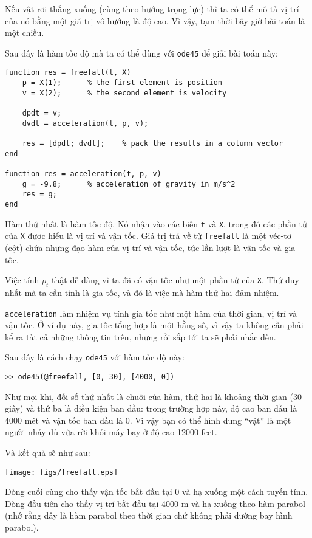 \documentclass[12pt]{book}
\begin{document}
Nếu vật rơi thẳng xuống (cùng theo hướng trọng lực) thì ta
có thể mô tả vị trí của nó bằng một giá trị vô hướng là độ cao.
Vì vậy, tạm thời bây giờ bài toán là một chiều.

Sau đây là hàm tốc độ mà ta có thể dùng với {\tt ode45} để giải
bài toán này:

\begin{verbatim}
function res = freefall(t, X)
    p = X(1);      % the first element is position
    v = X(2);      % the second element is velocity

    dpdt = v;                          
    dvdt = acceleration(t, p, v);

    res = [dpdt; dvdt];    % pack the results in a column vector
end

function res = acceleration(t, p, v)
    g = -9.8;      % acceleration of gravity in m/s^2
    res = g;
end
\end{verbatim}
%
Hàm thứ nhất là hàm tốc độ. Nó nhận vào các biến {\tt t} và
{\tt X}, trong đó các phần tử của {\tt X} được hiểu là vị trí
và vận tốc. Giá trị trả về từ {\tt freefall} là một véc-tơ (cột)
chứa những đạo hàm của vị trí và vận tốc, tức lần lượt là
vận tốc và gia tốc.

Việc tính $p_t$ thật dễ dàng vì ta đã có vận tốc như một
phần tử của {\tt X}. Thứ duy nhất mà ta cần tính là gia tốc,
và đó là việc mà hàm thứ hai đảm nhiệm.

{\tt acceleration} làm nhiệm vụ tính gia tốc như một hàm của
thời gian, vị trí và vận tốc. Ở ví dụ này, gia tốc tổng hợp là một
hằng số, vì vậy ta không cần phải kể ra tất cả những thông tin
trên, nhưng rồi sắp tới ta sẽ phải nhắc đến.

Sau đây là cách chạy {\tt ode45} với hàm tốc độ này:

\begin{verbatim}
>> ode45(@freefall, [0, 30], [4000, 0])
\end{verbatim}
%
Như mọi khi, đối số thứ nhất là chuôi của hàm, thứ hai là khoảng
thời gian (30 giây) và thứ ba là điều kiện ban đầu: trong trường
hợp này, độ cao ban đầu là 4000 mét và vận tốc ban đầu là 0.
Vì vậy bạn có thể hình dung ``vật'' là một người nhảy dù vừa
rời khỏi máy bay ở độ cao 12000 feet.

Và kết quả sẽ như sau:

\centerline{\texttt{[image: figs/freefall.eps]}}

Dòng cuối cùng cho thấy vận tốc bắt đầu tại 0 và hạ xuống
một cách tuyến tính. Dòng đầu tiên cho thấy vị trí bắt đầu
tại 4000 m và hạ xuống theo hàm parabol (nhớ rằng đây là
hàm parabol theo thời gian chứ không phải đường bay hình
parabol).
\end{document}
